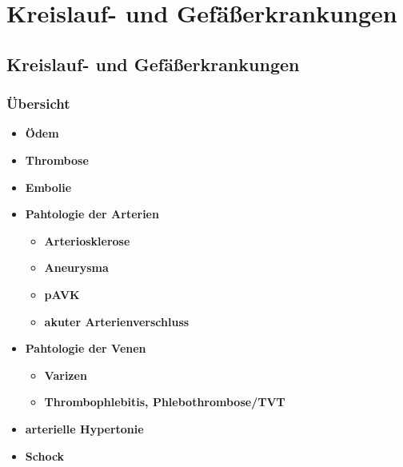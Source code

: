 \section*{Kreislauf- und Gefäßerkrankungen}
	\subsection{Kreislauf- und Gefäßerkrankungen}
		\subsubsection{Übersicht}
			\begin{itemize}
				\item \textbf{Ödem}
				\item \textbf{Thrombose}
				\item \textbf{Embolie}
				\item \textbf{Pahtologie der Arterien}
					\begin{itemize}
						\item \textbf{Arteriosklerose}
						\item \textbf{Aneurysma}
						\item \textbf{pAVK}
						\item \textbf{akuter Arterienverschluss}
					\end{itemize}
				\item \textbf{Pahtologie der Venen}
					\begin{itemize}
						\item \textbf{Varizen}
						\item \textbf{Thrombophlebitis, Phlebothrombose/TVT}
					\end{itemize}
				\item \textbf{arterielle Hypertonie}
				\item \textbf{Schock}
			\end{itemize}
